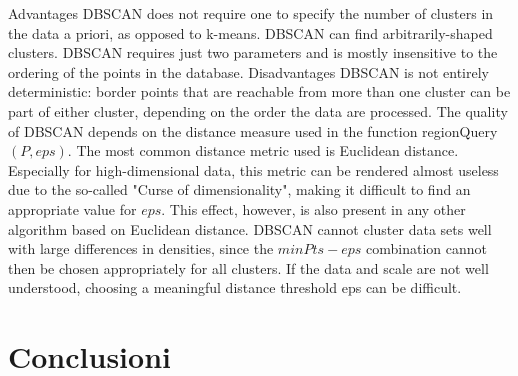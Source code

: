 \documentclass[english]{article}
\begin{document}
%
%
%
%
%
%

Advantages
DBSCAN does not require one to specify the number of clusters in the data a priori, as opposed to k-means.
DBSCAN can find arbitrarily-shaped clusters.
DBSCAN requires just two parameters and is mostly insensitive to the ordering of the points in the database. 
Disadvantages
DBSCAN is not entirely deterministic: border points that are reachable from more than one cluster can be part of either cluster, depending on the order the data are processed.
The quality of DBSCAN depends on the distance measure used in the function regionQuery$(P,eps)$. 
The most common distance metric used is Euclidean distance. 
Especially for high-dimensional data, this metric can be rendered almost useless due to the so-called "Curse of dimensionality", making it difficult to find an appropriate value for $eps$. 
This effect, however, is also present in any other algorithm based on Euclidean distance. 
DBSCAN cannot cluster data sets well with large differences in densities, since the $minPts-eps$ combination cannot then be chosen appropriately for all clusters.
If the data and scale are not well understood, choosing a meaningful distance threshold eps can be difficult.\\
\newpage

\section{Conclusioni}
\end{document}
